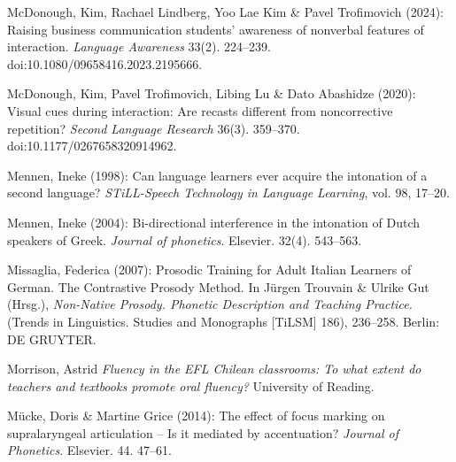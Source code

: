 \begin{styleBibliography}
McDonough, Kim, Rachael Lindberg, Yoo Lae Kim \& Pavel Trofimovich (2024): Raising business communication students’ awareness of nonverbal features of interaction. \textit{Language Awareness} 33(2). 224–239. doi:10.1080/09658416.2023.2195666.
\end{styleBibliography}

\begin{styleBibliography}
McDonough, Kim, Pavel Trofimovich, Libing Lu \& Dato Abashidze (2020): Visual cues during interaction: Are recasts different from noncorrective repetition? \textit{Second Language Research} 36(3). 359–370. doi:10.1177/0267658320914962.
\end{styleBibliography}

\begin{styleBibliography}
Mennen, Ineke (1998): Can language learners ever acquire the intonation of a second language? \textit{STiLL-Speech Technology in Language Learning}, vol. 98, 17–20.
\end{styleBibliography}

\begin{styleBibliography}
Mennen, Ineke (2004): Bi-directional interference in the intonation of Dutch speakers of Greek. \textit{Journal of phonetics}. Elsevier. 32(4). 543–563.
\end{styleBibliography}

\begin{styleBibliography}
Missaglia, Federica (2007): Prosodic Training for Adult Italian Learners of German. The Contrastive Prosody Method. In Jürgen Trouvain \& Ulrike Gut (Hrsg.), \textit{Non-Native Prosody. Phonetic Description and Teaching Practice.} (Trends in Linguistics. Studies and Monographs [TiLSM] 186), 236–258. Berlin: DE GRUYTER.
\end{styleBibliography}

\begin{styleBibliography}
Morrison, Astrid \textit{Fluency in the EFL Chilean classrooms: To what extent do teachers and textbooks promote oral fluency?} University of Reading.
\end{styleBibliography}

\begin{styleBibliography}
Mücke, Doris \& Martine Grice (2014): The effect of focus marking on supralaryngeal articulation – Is it mediated by accentuation? \textit{Journal of Phonetics}. Elsevier. 44. 47–61.
\end{styleBibliography}


